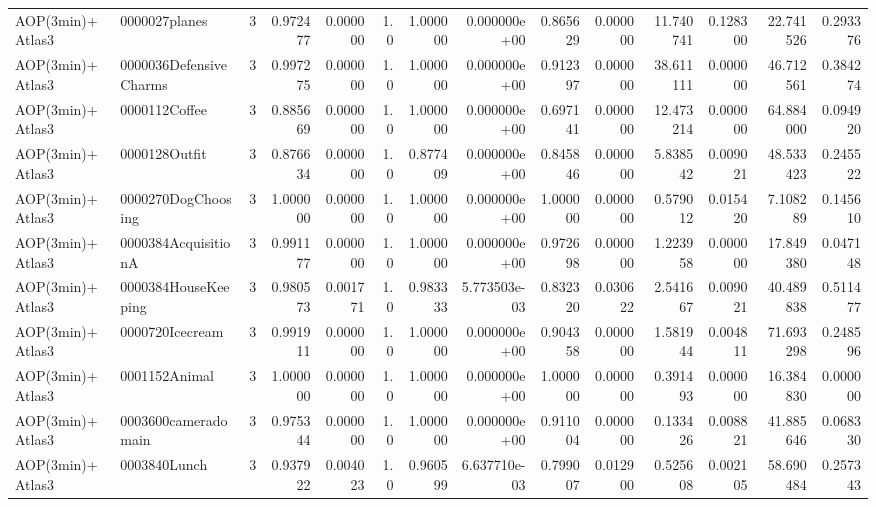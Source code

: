 \begin{tabular}{llrr|r|rr|rr|rr|rrr}
         AOP(3min)+Atlas3 &          0000027planes &       3 & 0.972477 & 0.000000 &  1.0 &      1.000000 & 0.000000e+00 &      0.865629 & 0.000000 &     11.740741 &    0.128300 &    22.741526 &    0.293376 \\
         AOP(3min)+Atlas3 & 0000036DefensiveCharms &       3 & 0.997275 & 0.000000 &  1.0 &      1.000000 & 0.000000e+00 &      0.912397 & 0.000000 &     38.611111 &    0.000000 &    46.712561 &    0.384274 \\
         AOP(3min)+Atlas3 &          0000112Coffee &       3 & 0.885669 & 0.000000 &  1.0 &      1.000000 & 0.000000e+00 &      0.697141 & 0.000000 &     12.473214 &    0.000000 &    64.884000 &    0.094920 \\
         AOP(3min)+Atlas3 &          0000128Outfit &       3 & 0.876634 & 0.000000 &  1.0 &      0.877409 & 0.000000e+00 &      0.845846 & 0.000000 &      5.838542 &    0.009021 &    48.533423 &    0.245522 \\
         AOP(3min)+Atlas3 &     0000270DogChoosing &       3 & 1.000000 & 0.000000 &  1.0 &      1.000000 & 0.000000e+00 &      1.000000 & 0.000000 &      0.579012 &    0.015420 &     7.108289 &    0.145610 \\
         AOP(3min)+Atlas3 &    0000384AcquisitionA &       3 & 0.991177 & 0.000000 &  1.0 &      1.000000 & 0.000000e+00 &      0.972698 & 0.000000 &      1.223958 &    0.000000 &    17.849380 &    0.047148 \\
         AOP(3min)+Atlas3 &    0000384HouseKeeping &       3 & 0.980573 & 0.001771 &  1.0 &      0.983333 & 5.773503e-03 &      0.832320 & 0.030622 &      2.541667 &    0.009021 &    40.489838 &    0.511477 \\
         AOP(3min)+Atlas3 &        0000720Icecream &       3 & 0.991911 & 0.000000 &  1.0 &      1.000000 & 0.000000e+00 &      0.904358 & 0.000000 &      1.581944 &    0.004811 &    71.693298 &    0.248596 \\
         AOP(3min)+Atlas3 &          0001152Animal &       3 & 1.000000 & 0.000000 &  1.0 &      1.000000 & 0.000000e+00 &      1.000000 & 0.000000 &      0.391493 &    0.000000 &    16.384830 &    0.000000 \\
         AOP(3min)+Atlas3 &    0003600cameradomain &       3 & 0.975344 & 0.000000 &  1.0 &      1.000000 & 0.000000e+00 &      0.911004 & 0.000000 &      0.133426 &    0.008821 &    41.885646 &    0.068330 \\
         AOP(3min)+Atlas3 &           0003840Lunch &       3 & 0.937922 & 0.004023 &  1.0 &      0.960599 & 6.637710e-03 &      0.799007 & 0.012900 &      0.525608 &    0.002105 &    58.690484 &    0.257343 \\

\end{tabular}
